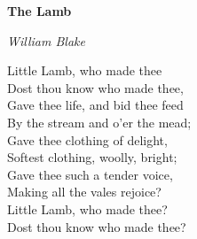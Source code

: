 \documentclass[imakeidx]{memoir}
\begin{document}
\textbf{The Lamb}

\emph{William Blake}

\begingroup
	\beginnumbering \autopar

Little Lamb, who made thee\\
Dost thou know who made thee,\\
Gave thee life, and bid thee feed\\
By the stream and o'er the mead;\\
Gave thee clothing of delight,\\
Softest clothing, woolly, bright;\\
Gave thee such a tender voice,\\
Making all the vales rejoice?\\
Little Lamb, who made thee?\\
Dost thou know who made thee?

	\endnumbering
\endgroup

\printindex
\end{document}
